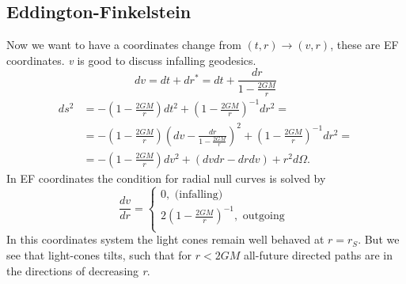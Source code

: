 \subsection{Eddington-Finkelstein}
Now we want to have a coordinates change from $\left( t,r \right) \to \left( v,r \right)$, these are EF coordinates. \emph{v} is good to discuss infalling geodesics.
\[
dv = dt + dr^{*} = dt + \frac{dr}{1- \frac{2GM}{r}}
\]
\begin{align}
	ds^{2} &= - \left( 1 - \frac{2GM}{r} \right)dt^{2} + \left( 1- \frac{2GM}{r} \right)^{-1}dr^{2} = \\
	       & = - \left( 1- \frac{2GM}{r} \right) \left( dv - \frac{dr}{1 - \frac{2GM}{r}} \right)^{2} + \left( 1 - \frac{2GM}{r} \right)^{-1} dr^{2} = \\
	       & = - \left( 1 - \frac{2GM}{r} \right)dv^{2} + \left( dvdr-drdv \right) + r^{2}d\Omega .
\end{align}
In EF coordinates the condition for radial null curves is solved by
\begin{equation}
\frac{d v}{d r} = \begin{cases}
0,   \text{ (infalling) }\\
2 \left( 1 - \frac{2GM}{r} \right)^{-1} , \text{ outgoing }\\
\end{cases}
\end{equation}
In this coordinates system the light cones remain well behaved at $r=r_{S}$. But we see that light-cones tilts, such that for $r<2GM$ all-future directed paths are in the directions of decreasing \emph{r}.\par
\bigskip

